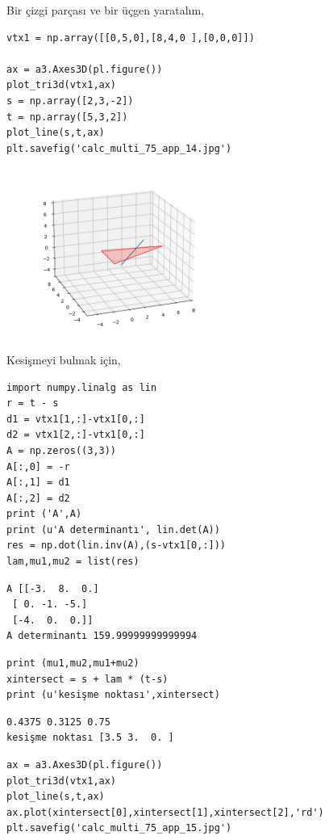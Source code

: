 \documentclass[12pt,fleqn]{article}\usepackage{../../common}
\begin{document}
Bir çizgi parçası ve bir üçgen yaratalım,

\begin{verbatim}
vtx1 = np.array([[0,5,0],[8,4,0 ],[0,0,0]])

ax = a3.Axes3D(pl.figure())
plot_tri3d(vtx1,ax)
s = np.array([2,3,-2])
t = np.array([5,3,2])
plot_line(s,t,ax)
plt.savefig('calc_multi_75_app_14.jpg')
\end{verbatim}

\includegraphics[width=20em]{calc_multi_75_app_14.jpg}

Kesişmeyi bulmak için,

\begin{verbatim}
import numpy.linalg as lin
r = t - s
d1 = vtx1[1,:]-vtx1[0,:]
d2 = vtx1[2,:]-vtx1[0,:]
A = np.zeros((3,3))
A[:,0] = -r
A[:,1] = d1
A[:,2] = d2
print ('A',A)
print (u'A determinantı', lin.det(A))
res = np.dot(lin.inv(A),(s-vtx1[0,:]))
lam,mu1,mu2 = list(res)
\end{verbatim}

\begin{verbatim}
A [[-3.  8.  0.]
 [ 0. -1. -5.]
 [-4.  0.  0.]]
A determinantı 159.99999999999994
\end{verbatim}

\begin{verbatim}
print (mu1,mu2,mu1+mu2)
xintersect = s + lam * (t-s)
print (u'kesişme noktası',xintersect)
\end{verbatim}

\begin{verbatim}
0.4375 0.3125 0.75
kesişme noktası [3.5 3.  0. ]
\end{verbatim}

\begin{verbatim}
ax = a3.Axes3D(pl.figure())
plot_tri3d(vtx1,ax)
plot_line(s,t,ax)
ax.plot(xintersect[0],xintersect[1],xintersect[2],'rd')
plt.savefig('calc_multi_75_app_15.jpg')
\end{verbatim}
\end{document}
